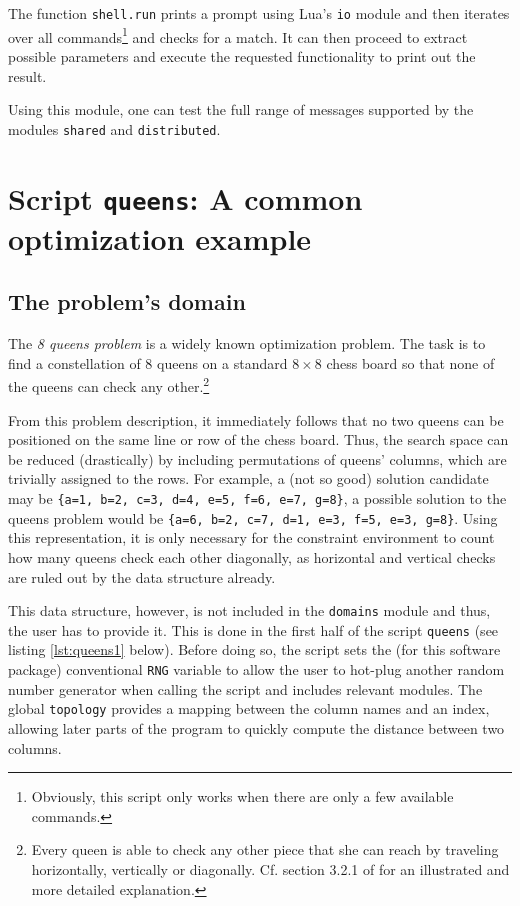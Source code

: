 \begin{appendices}
The function \texttt{shell.run} prints a prompt using Lua's \texttt{io} module and then iterates over all commands\footnote{Obviously, this script only works when there are only a few available commands.} and checks for a match. It can then proceed to extract possible parameters and execute the requested functionality to print out the result.

Using this module, one can test the full range of messages supported by the modules \texttt{shared} and \texttt{distributed}.

\chapter{Script \texttt{queens}: A common optimization example}
\label{chap:app:queens}

\section{The problem's domain}
\label{sec:app:queens:domain}

The \emph{8 queens problem} is a widely known optimization problem. The task is to find a constellation of 8 queens on a standard $8 \times 8$ chess board so that none of the queens can check any other.\footnote{Every queen is able to check any other piece that she can reach by traveling horizontally, vertically or diagonally. Cf. section 3.2.1 of \cite{RussellNorvig2003} for an illustrated and more detailed explanation.}

From this problem description, it immediately follows that no two queens can be positioned on the same line or row of the chess board. Thus, the search space can be reduced (drastically) by including permutations of queens' columns, which are trivially assigned to the rows. For example, a (not so good) solution candidate may be \texttt{\{a=1, b=2, c=3, d=4, e=5, f=6, e=7, g=8\}}, a possible solution to the queens problem would be \texttt{\{a=6, b=2, c=7, d=1, e=3, f=5, e=3, g=8\}}. Using this representation, it is only necessary for the constraint environment to count how many queens check each other diagonally, as horizontal and vertical checks are ruled out by the data structure already.

This data structure, however, is not included in the \texttt{domains} module and thus, the user has to provide it. This is done in the first half of the script \texttt{queens} (see listing \ref{lst:queens1} below). Before doing so, the script sets the (for this software package) conventional \texttt{RNG} variable to allow the user to hot-plug another random number generator when calling the script and includes relevant modules. The global \texttt{topology} provides a mapping between the column names and an index, allowing later parts of the program to quickly compute the distance between two columns.


\end{appendices}
